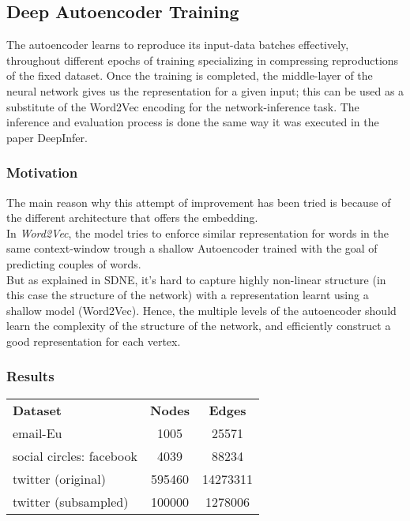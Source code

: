 \documentclass{article}
\begin{document}
			\subsection{Deep Autoencoder Training}
			The autoencoder learns to reproduce its input-data batches effectively, throughout different epochs of training specializing in compressing reproductions of the fixed dataset. Once the training is completed, the middle-layer of the neural network gives us the representation for a given input; this can be used as a substitute of the Word2Vec encoding for the network-inference task. The inference and evaluation process is done the same way it was executed in the paper DeepInfer.
			
				\subsubsection{Motivation}
				The main reason why this attempt of improvement has been tried is because of the different architecture that offers the embedding.\\
				In \textit{Word2Vec}, the model tries to enforce similar representation for words in the same context-window trough a shallow Autoencoder trained with the goal of predicting couples of words.\\
				But as explained in SDNE, it's hard to capture highly non-linear structure (in this case the structure of the network) with a representation learnt using a shallow model (Word2Vec). Hence, the multiple levels of the autoencoder should learn the complexity of the structure of the network, and efficiently construct a good representation for each vertex.
				
				\subsubsection{Results}
				\begin{center}
					\begin{tabular}{l | c | c}
						\textbf{Dataset} & \textbf{Nodes} & \textbf{Edges} \\
						email-Eu & 1005 & 25571 \\
						social circles: facebook & 4039 & 88234 \\
						twitter (original) & 595460 & 14273311\\
						twitter (subsampled) & 100000 & 1278006
					\end{tabular}	
				\end{center}
			
\end{document}
